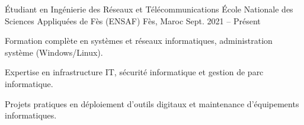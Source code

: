 
\begin{cventries}

  \cventry
  {Étudiant en Ingénierie des Réseaux et Télécommunications} %
  {École Nationale des Sciences Appliquées de Fès (ENSAF)} %
  {Fès, Maroc} %
  {Sept. 2021 – Présent} %
  {
    \begin{cvitems} %
      \item {Formation complète en systèmes et réseaux informatiques, administration système (Windows/Linux).}
      \item {Expertise en infrastructure IT, sécurité informatique et gestion de parc informatique.}
      \item {Projets pratiques en déploiement d'outils digitaux et maintenance d'équipements informatiques.}
    \end{cvitems}
  }
\end{cventries}